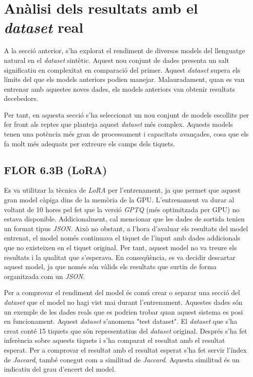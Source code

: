 \section{Anàlisi dels resultats amb el \textit{dataset} real}

A la secció anterior, s'ha explorat el rendiment de diversos models del llenguatge natural en el \textit{dataset} sintètic. Aquest nou conjunt de dades presenta un salt significatiu en complexitat en comparació del primer. Aquest \textit{dataset} supera els límits del que els models anteriors podien manejar. Malauradament, quan es van entrenar amb aquestes noves dades, els models anteriors van obtenir resultats decebedors.

Per tant, en aquesta secció s'ha seleccionat un nou conjunt de models escollits per fer front als reptes que planteja aquest \textit{dataset} més complex. Aquests models tenen una potència més gran de processament i capacitats avançades, cosa que els fa molt més adequats per extreure els camps dels tiquets.

\subsection{FLOR 6.3B (LoRA)}
Es va utilitzar la tècnica de \textit{LoRA} per l'entrenament, ja que permet que aquest gran model càpiga dins de la memòria de la GPU. L'entrenament va durar al voltant de 10 hores pel fet que la versió \textit{GPTQ} (més optimitzada per GPU) no estava disponible. Addicionalment, cal mencionar que les dades de sortida tenien un format tipus \textit{JSON}. Això no obstant, a l'hora d'avaluar els resultats del model entrenat, el model només continuava el tiquet de l'input amb dades addicionals que no existeixen en el tiquet original. Per tant, aquest model no va treure els resultats i la qualitat que s'esperava. En conseqüència, es va decidir descartar aquest model, ja que només són vàlids els resultats que surtin de forma organitzada com un \textit{JSON}.

Per a comprovar el rendiment del model és comú crear o separar una secció del \textit{dataset} que el model no hagi vist mai durant l'entrenament. Aquestes dades són un exemple de les dades reals que es podrien trobar quan aquest sistema es posi en funcionament. Aquest \textit{dataset} s'anomena "test dataset". El \textit{dataset} que s'ha creat conté 15 tiquets que són representatius del \textit{dataset} original. Després s'ha fet inferència sobre aquests tiquets i s'ha comparat el resultat amb el resultat esperat. Per a comprovar el resultat amb el resultat esperat s'ha fet servir l'índex de \textit{Jaccard}, també conegut com a similitud de \textit{Jaccard}. Aquesta similitud és un indicatiu del grau d'encert del model.

